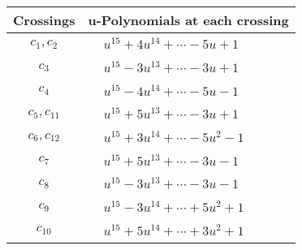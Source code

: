 \documentclass[1p]{elsarticle_modified}
\theoremstyle{definition}
\begin{document}
\begin{tabular}{m{50pt}|m{274pt}}
Crossings & \hspace{64pt}u-Polynomials at each crossing \\
\hline $$\begin{aligned}c_{1},c_{2}\end{aligned}$$&$\begin{aligned}
&u^{15}+4 u^{14}+\cdots-5 u+1
\end{aligned}$\\
\hline $$\begin{aligned}c_{3}\end{aligned}$$&$\begin{aligned}
&u^{15}-3 u^{13}+\cdots-3 u+1
\end{aligned}$\\
\hline $$\begin{aligned}c_{4}\end{aligned}$$&$\begin{aligned}
&u^{15}-4 u^{14}+\cdots-5 u-1
\end{aligned}$\\
\hline $$\begin{aligned}c_{5},c_{11}\end{aligned}$$&$\begin{aligned}
&u^{15}+5 u^{13}+\cdots-3 u+1
\end{aligned}$\\
\hline $$\begin{aligned}c_{6},c_{12}\end{aligned}$$&$\begin{aligned}
&u^{15}+3 u^{14}+\cdots-5 u^2-1
\end{aligned}$\\
\hline $$\begin{aligned}c_{7}\end{aligned}$$&$\begin{aligned}
&u^{15}+5 u^{13}+\cdots-3 u-1
\end{aligned}$\\
\hline $$\begin{aligned}c_{8}\end{aligned}$$&$\begin{aligned}
&u^{15}-3 u^{13}+\cdots-3 u-1
\end{aligned}$\\
\hline $$\begin{aligned}c_{9}\end{aligned}$$&$\begin{aligned}
&u^{15}-3 u^{14}+\cdots+5 u^2+1
\end{aligned}$\\
\hline $$\begin{aligned}c_{10}\end{aligned}$$&$\begin{aligned}
&u^{15}+5 u^{14}+\cdots+3 u^2+1
\end{aligned}$\\
\hline
\end{tabular}\\~\\
\end{document}
